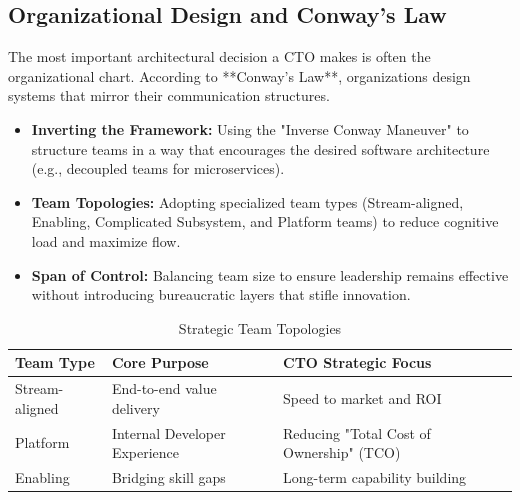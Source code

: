 \subsection{Organizational Design and Conway's Law}

The most important architectural decision a CTO makes is often the organizational chart. According to **Conway's Law**, organizations design systems that mirror their communication structures.

\begin{itemize}
    \item \textbf{Inverting the Framework:} Using the "Inverse Conway Maneuver" to structure teams in a way that encourages the desired software architecture (e.g., decoupled teams for microservices).
    \item \textbf{Team Topologies:} Adopting specialized team types (Stream-aligned, Enabling, Complicated Subsystem, and Platform teams) to reduce cognitive load and maximize flow.
    \item \textbf{Span of Control:} Balancing team size to ensure leadership remains effective without introducing bureaucratic layers that stifle innovation.
\end{itemize}

\begin{table}[h]
    \centering
    \begin{tabular}{|p{4cm}|p{5cm}|p{5cm}|}
        \hline
        \textbf{Team Type} & \textbf{Core Purpose} & \textbf{CTO Strategic Focus} \\
        \hline
        Stream-aligned & End-to-end value delivery & Speed to market and ROI \\
        \hline
        Platform & Internal Developer Experience & Reducing "Total Cost of Ownership" (TCO) \\
        \hline
        Enabling & Bridging skill gaps & Long-term capability building \\
        \hline
    \end{tabular}
    \caption{Strategic Team Topologies}
    \label{tab:team_topologies}
\end{table}
